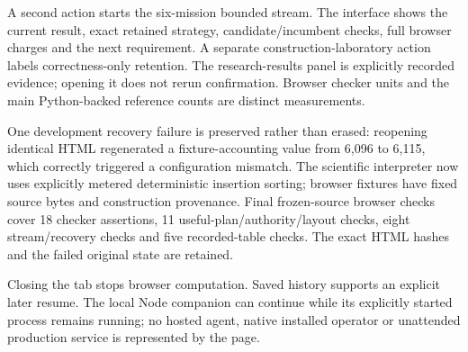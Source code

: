 A second action starts the six-mission bounded stream. The interface shows the current result, exact retained strategy, candidate/incumbent checks, full browser charges and the next requirement. A separate construction-laboratory action labels correctness-only retention. The research-results panel is explicitly recorded evidence; opening it does not rerun confirmation. Browser checker units and the main Python-backed reference counts are distinct measurements.

One development recovery failure is preserved rather than erased: reopening identical HTML regenerated a fixture-accounting value from 6,096 to 6,115, which correctly triggered a configuration mismatch. The scientific interpreter now uses explicitly metered deterministic insertion sorting; browser fixtures have fixed source bytes and construction provenance. Final frozen-source browser checks cover 18 checker assertions, 11 useful-plan/authority/layout checks, eight stream/recovery checks and five recorded-table checks. The exact HTML hashes and the failed original state are retained.

Closing the tab stops browser computation. Saved history supports an explicit later resume. The local Node companion can continue while its explicitly started process remains running; no hosted agent, native installed operator or unattended production service is represented by the page.
